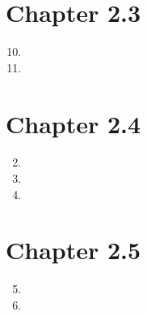 \documentclass{article}
\newcommand{\Chapter}[1]{\section*{Chapter #1}}
\begin{document}
\Chapter{2.3}
\begin{enumerate}[1.]
\setcounter{enumi}{9}
\item

\setcounter{enumi}{12}
\item 
\end{enumerate}

\Chapter{2.4}
\begin{enumerate}[1.]
\setcounter{enumi}{1}
\item

\item

\setcounter{enumi}{7}
\item

\end{enumerate}

\Chapter{2.5}
\begin{enumerate}[1.]
\setcounter{enumi}{4}
\item

\setcounter{enumi}{9}
\item
\end{enumerate}
\end{document}

